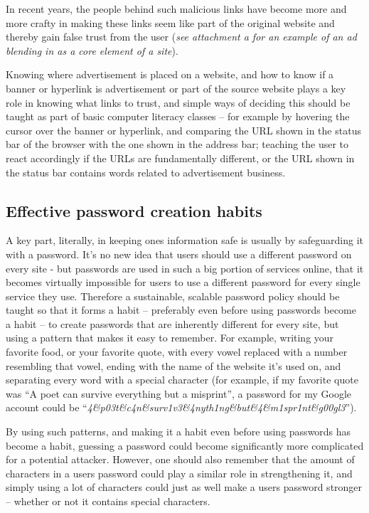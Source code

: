 \documentclass[twocolumn,letterpaper]{article}
\begin{document}
In recent years, the people behind such malicious links have become more and more crafty in making these links seem like
part of the original website and thereby gain false trust from the user (\textit{see attachment a for an example of an
ad blending in as a core element of a site}).

Knowing where advertisement is placed on a website, and how to know if a banner or hyperlink is advertisement or part of
the source website plays a key role in knowing what links to trust, and simple ways of deciding this should be taught
as part of basic computer literacy classes – for example by hovering the cursor over the banner or hyperlink, and
comparing the URL shown in the status bar of the browser with the one shown in the address bar; teaching the user to
react accordingly if the URLs are fundamentally different, or the URL shown in the status bar contains words related to
advertisement business. 

\subsection[Effective password creation habits]{\bfseries \textup{Effective password creation habits}}
A key part, literally, in keeping ones information safe is usually by safeguarding it with a password. It's no new idea
that users should use a different password on every site - but passwords are used in such a big portion of services
online, that it becomes virtually impossible for users to use a different password for every single service they use.
Therefore a sustainable, scalable password policy should be taught so that it forms a habit – preferably even before
using passwords become a habit – to create passwords that are inherently different for every site, but using a pattern
that makes it easy to remember. For example, writing your favorite food, or your favorite quote, with every vowel
replaced with a number resembling that vowel, ending with the name of the website it's used on, and separating every
word with a special character (for example, if my favorite quote was “A poet can survive everything but a misprint”, a
password for my Google account could be “\textit{4\&p03t\&c4n\&surv1v3\&4nyth1ng\&but\&4\&m1spr1nt\&g00gl3}”).

By using such patterns, and making it a habit even before using passwords has become a habit, guessing a password could
become significantly more complicated for a potential attacker. However, one should also remember that the amount of
characters in a users password could play a similar role in strengthening it, and simply using a lot of characters
could just as well make a users password stronger – whether or not it contains special characters. 
\end{document}
